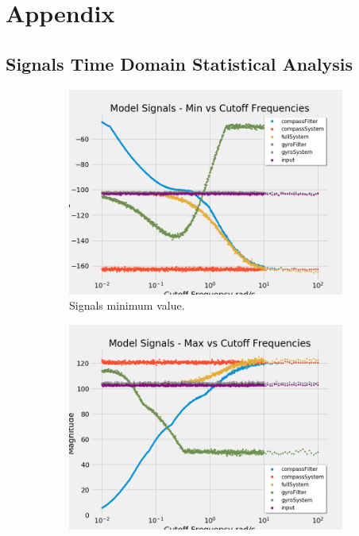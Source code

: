 \section{Appendix}

\subsection{Signals Time Domain Statistical Analysis}
\begin{figure}[H]
\begin{subfigure}{.5\textwidth}
  \centering
  \includegraphics[width=\linewidth, height=\paperheight/5]{img/iterable/modelSignals/modelminSignals.png}  
  \caption{Signals minimum value.}
  \label{fig:model_min}
\end{subfigure}
\begin{subfigure}{.5\textwidth}
  \centering
  \includegraphics[width=\linewidth, height=\paperheight/5]{img/iterable/modelSignals/modelmaxSignals.png} 

\end{subfigure}
\end{figure}
